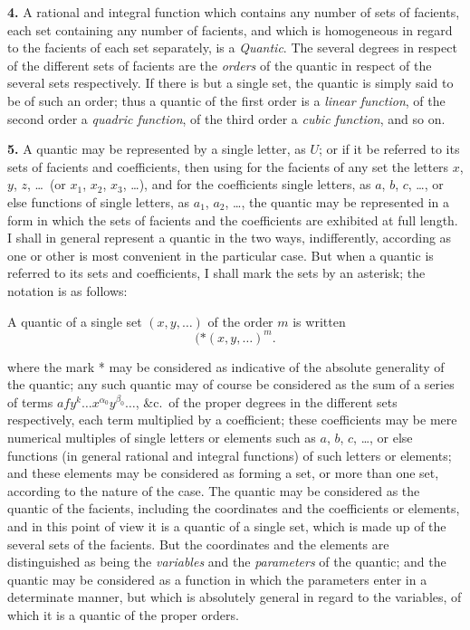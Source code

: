 \documentclass[12pt,a4paper]{article}
\begin{document}
\textbf{4.} A rational and integral function which contains any number of sets of facients, each set containing any number of facients, and which is homogeneous in regard to the facients of each set separately, is a \textit{Quantic}. The several degrees in respect of the different sets of facients are the \textit{orders} of the quantic in respect of the several sets respectively. If there is but a single set, the quantic is simply said to be of such an order; thus a quantic of the first order is a \textit{linear function}, of the second order a \textit{quadric function}, of the third order a \textit{cubic function}, and so on.

\textbf{5.} A quantic may be represented by a single letter, as $U$; or if it be referred to its sets of facients and coefficients, then using for the facients of any set the letters $x$, $y$, $z$, \ldots\ (or $x_1$, $x_2$, $x_3$, \ldots), and for the coefficients single letters, as $a$, $b$, $c$, \ldots, or else functions of single letters, as $a_1$, $a_2$, \ldots, the quantic may be represented in a form in which the sets of facients and the coefficients are exhibited at full length. I shall in general represent a quantic in the two ways, indifferently, according as one or other is most convenient in the particular case. But when a quantic is referred to its sets and coefficients, I shall mark the sets by an asterisk; the notation is as follows:

A quantic of a single set $(x, y, \ldots)$ of the order $m$ is written
\[
(*\!\!\!\!\!(x, y, \ldots)^m.
\]

\newpage
\setcounter{page}{223}

where the mark * may be considered as indicative of the absolute generality of the quantic; any such quantic may of course be considered as the sum of a series of terms $afy^k \ldots x^{\alpha_0} y^{\beta_0} \ldots$, \&c.\ of the proper degrees in the different sets respectively, each term multiplied by a coefficient; these coefficients may be mere numerical multiples of single letters or elements such as $a$, $b$, $c$, \ldots, or else functions (in general rational and integral functions) of such letters or elements; and these elements may be considered as forming a set, or more than one set, according to the nature of the case. The quantic may be considered as the quantic of the facients, including the coordinates and the coefficients or elements, and in this point of view it is a quantic of a single set, which is made up of the several sets of the facients. But the coordinates and the elements are distinguished as being the \textit{variables} and the \textit{parameters} of the quantic; and the quantic may be considered as a function in which the parameters enter in a determinate manner, but which is absolutely general in regard to the variables, of which it is a quantic of the proper orders.
\end{document}
